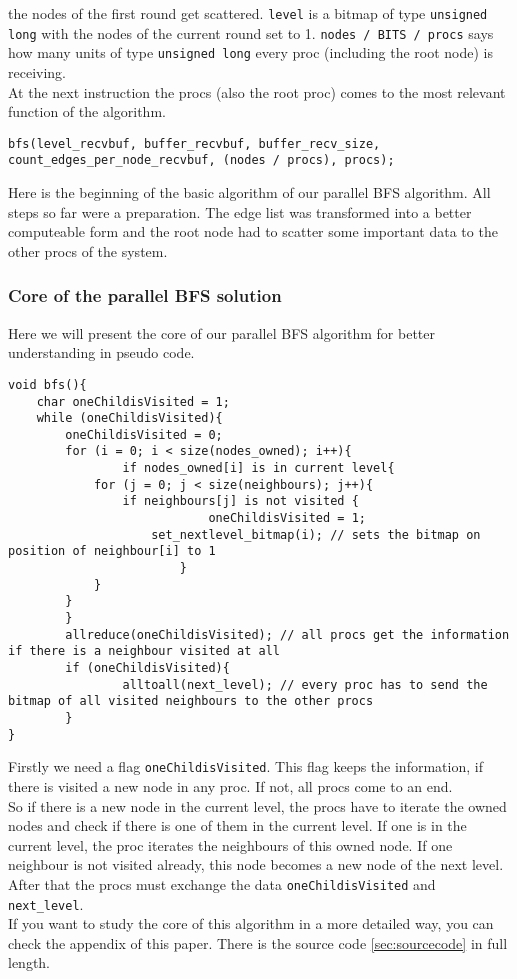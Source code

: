 \documentclass[12pt,a4paper]{article}
\begin{document}
the nodes of the first round get scattered. \lstinline{level} is a bitmap of type \lstinline{unsigned long} with the nodes of the current round set to 1. \lstinline{nodes / BITS / procs} says how many units of type \lstinline{unsigned long} every proc (including the root node) is receiving. \\
At the next instruction the procs (also the root proc) comes to the most relevant function of the algorithm.
\begin{lstlisting}
bfs(level_recvbuf, buffer_recvbuf, buffer_recv_size, count_edges_per_node_recvbuf, (nodes / procs), procs);
\end{lstlisting}
Here is the beginning of the basic algorithm of our parallel BFS algorithm. All steps so far were a preparation. The edge list was transformed into a better computeable form and the root node had to scatter some important data to the other procs of the system.
\subsubsection{Core of the parallel BFS solution}
Here we will present the core of our parallel BFS algorithm for better understanding in pseudo code.
\begin{lstlisting}
void bfs(){
    char oneChildisVisited = 1;
    while (oneChildisVisited){
        oneChildisVisited = 0;
        for (i = 0; i < size(nodes_owned); i++){
        		if nodes_owned[i] is in current level{
			for (j = 0; j < size(neighbours); j++){
				if neighbours[j] is not visited {
            				oneChildisVisited = 1;
					set_nextlevel_bitmap(i); // sets the bitmap on position of neighbour[i] to 1
            			}
			}
		}
        }
        allreduce(oneChildisVisited); // all procs get the information if there is a neighbour visited at all
        if (oneChildisVisited){
        		alltoall(next_level); // every proc has to send the bitmap of all visited neighbours to the other procs
        }
}
\end{lstlisting}
Firstly we need a flag \lstinline{oneChildisVisited}. This flag keeps the information, if there is visited a new node in any proc. If not, all procs come to an end.\\
So if there is a new node in the current level, the procs have to iterate the owned nodes and check if there is one of them in the current level. If one is in the current level, the proc iterates the neighbours of this owned node. If one neighbour is not visited already, this node becomes a new node of the next level. After that the procs must exchange the data \lstinline{oneChildisVisited} and \lstinline{next_level}. \\
If you want to study the core of this algorithm in a more detailed way, you can check the appendix of this paper. There is the source code \ref{sec:sourcecode} in full length.
\end{document}
